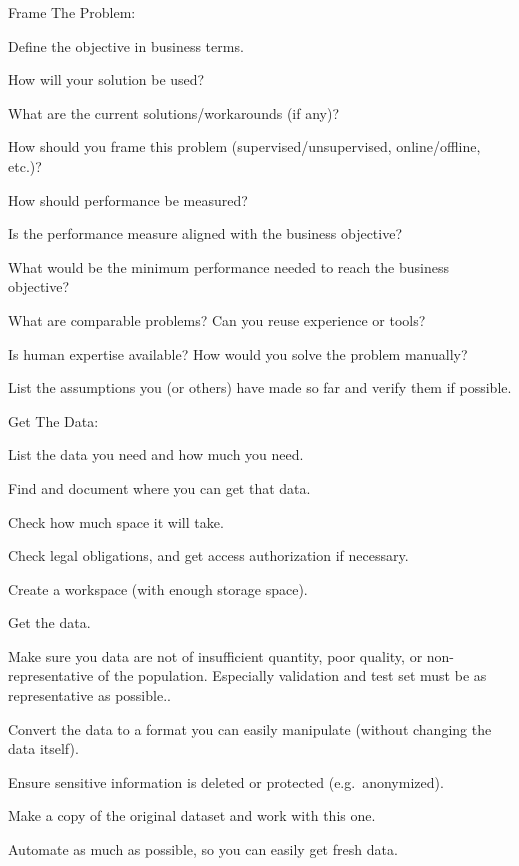 Frame The Problem:
\bit
\item Define the objective in business terms.
\item How will your solution be used?
\item What are the current solutions/workarounds (if any)?
\item How should you frame this problem (supervised/unsupervised, online/offline, etc.)?
\item How should performance be measured?
\item Is the performance measure aligned with the business objective?
\item What would be the minimum performance needed to reach the business objective?
\item What are comparable problems? Can you reuse experience or tools?
\item Is human expertise available? How would you solve the problem manually?
\item List the assumptions you (or others) have made so far and verify them if possible.
\eit

Get The Data:
\bit
\item List the data you need and how much you need.
\item Find and document where you can get that data.
\item Check how much space it will take.
\item Check legal obligations, and get access authorization if necessary.
\item Create a workspace (with enough storage space).
\item Get the data.
\item Make sure you data are not of insufficient quantity, poor quality, or non-representative of the population.
Especially validation and test set must be as representative as possible..
\item Convert the data to a format you can easily manipulate (without changing the data itself).
\item Ensure sensitive information is deleted or protected (e.g.\ anonymized).
\item Make a copy of the original dataset and work with this one.
\item Automate as much as possible, so you can easily get fresh data.
\eit

